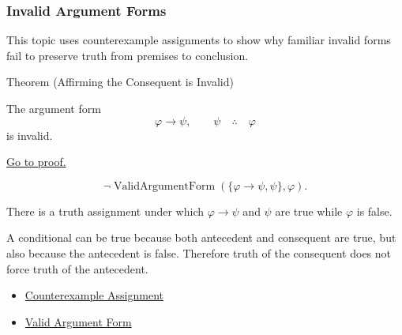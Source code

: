 \subsubsection*{Invalid Argument Forms}

\begin{remark*}
This topic uses counterexample assignments to show why familiar invalid forms
fail to preserve truth from premises to conclusion.
\end{remark*}

\begin{theorembox}{Theorem (Affirming the Consequent is Invalid)}
\begin{theorem}
\label{thm:affirming-consequent-invalid-propositional-logic}
The argument form
\[
\varphi\to\psi,\qquad \psi \quad\therefore\quad \varphi
\]
is invalid.

\noindent\hyperref[prf:affirming-consequent-invalid-propositional-logic]{Go to proof.}
\end{theorem}
\end{theorembox}

\begin{remark*}
\[
\neg\operatorname{ValidArgumentForm}(\{\varphi\to\psi,\psi\},\varphi).
\]
\end{remark*}

\begin{remark*}
There is a truth assignment under which \(\varphi\to\psi\) and \(\psi\) are true
while \(\varphi\) is false.
\end{remark*}

\begin{remark*}[Interpretation]
A conditional can be true because both antecedent and consequent are true, but
also because the antecedent is false. Therefore truth of the consequent does not
force truth of the antecedent.
\end{remark*}

\begin{dependencies}
\begin{itemize}
  \item \hyperref[def:counterexample-assignment-propositional-logic]{Counterexample Assignment}
  \item \hyperref[def:valid-argument-form-propositional-logic]{Valid Argument Form}
\end{itemize}
\end{dependencies}

